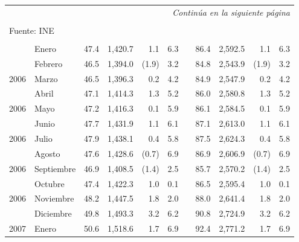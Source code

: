 \begin{center}
\begin{longtable}{llrrrrrrrrr}
		\hline\endhead
		\hline \multicolumn{11}{r}{\textit{Continúa en la siguiente página}} \\
		\endfoot
		&&&&&&&&&& \\[-0.9cm]
		\multicolumn{11}{l}{\footnotesize Fuente: INE}\\
		\endlastfoot
		\rowcolor{color1!0!white}    &&&&&&&&&& \\[-0.55cm]
		\rowcolor{color1!0!white}\multicolumn{1}{l}{2006} &	Enero	&	 47.4 	&	 1,420.7 	&	 1.1 	&	 6.3 	&  &	 86.4 	&	 2,592.5 	&	 1.1 	&	 6.3 	\\
		\rowcolor{color1!5!white}\multicolumn{1}{l}{	2006	}&	Febrero	&	 46.5 	&	 1,394.0 	&	 (1.9)	&	 3.2 	&  &	 84.8 	&	 2,543.9 	&	 (1.9)	&	 3.2 	\\
		\multicolumn{1}{l}{	2006	}&	Marzo	&	 46.5 	&	 1,396.3 	&	 0.2 	&	 4.2 	&  &	 84.9 	&	 2,547.9 	&	 0.2 	&	 4.2 	\\
		\rowcolor{color1!5!white}\multicolumn{1}{l}{	2006	}&	Abril	&	 47.1 	&	 1,414.3 	&	 1.3 	&	 5.2 	&  &	 86.0 	&	 2,580.8 	&	 1.3 	&	 5.2 	\\
		\multicolumn{1}{l}{	2006	}&	Mayo	&	 47.2 	&	 1,416.3 	&	 0.1 	&	 5.9 	&  &	 86.1 	&	 2,584.5 	&	 0.1 	&	 5.9 	\\
		\rowcolor{color1!5!white}\multicolumn{1}{l}{	2006	}&	Junio	&	 47.7 	&	 1,431.9 	&	 1.1 	&	 6.1 	&  &	 87.1 	&	 2,613.0 	&	 1.1 	&	 6.1 	\\
		\multicolumn{1}{l}{	2006	}&	Julio	&	 47.9 	&	 1,438.1 	&	 0.4 	&	 5.8 	&  &	 87.5 	&	 2,624.3 	&	 0.4 	&	 5.8 	\\
		\rowcolor{color1!5!white}\multicolumn{1}{l}{	2006	}&	Agosto	&	 47.6 	&	 1,428.6 	&	 (0.7)	&	 6.9 	&  &	 86.9 	&	 2,606.9 	&	 (0.7)	&	 6.9 	\\
		\multicolumn{1}{l}{	2006	}&	Septiembre	&	 46.9 	&	 1,408.5 	&	 (1.4)	&	 2.5 	&  &	 85.7 	&	 2,570.2 	&	 (1.4)	&	 2.5 	\\
		\rowcolor{color1!5!white}\multicolumn{1}{l}{	2006	}&	Octubre	&	 47.4 	&	 1,422.3 	&	 1.0 	&	 0.1 	&  &	 86.5 	&	 2,595.4 	&	 1.0 	&	 0.1 	\\
		\multicolumn{1}{l}{	2006	}&	Noviembre	&	 48.2 	&	 1,447.5 	&	 1.8 	&	 2.0 	&  &	 88.0 	&	 2,641.4 	&	 1.8 	&	 2.0 	\\
		\rowcolor{color1!5!white}\multicolumn{1}{l}{	2006	}&	Diciembre	&	 49.8 	&	 1,493.3 	&	 3.2 	&	 6.2 	&  &	 90.8 	&	 2,724.9 	&	 3.2 	&	 6.2 	\\
		\multicolumn{1}{l}{	2007	}&	Enero	&	 50.6 	&	 1,518.6 	&	 1.7 	&	 6.9 	&  &	 92.4 	&	 2,771.2 	&	 1.7 	&	 6.9 	\\

\end{longtable}
\end{center}
